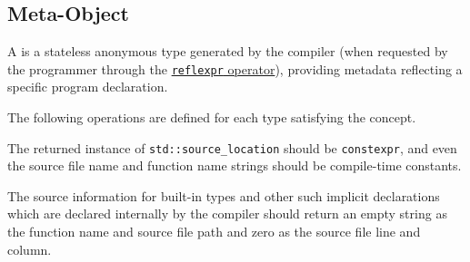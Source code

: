 \subsection{Meta-Object}
\label{concept-Meta-Object}

A  is a stateless anonymous type generated by the compiler
(when requested by the programmer through the 
\hyperref[section-reflection-operator]{\texttt{reflexpr} operator}),
providing metadata reflecting a specific program declaration.





The following operations are defined for each type satisfying the 
concept.



The returned instance of \texttt{std::source\_location} should be \texttt{constexpr},
and even the source file name and function name strings should be compile-time constants.

The source information for built-in types and other
such implicit declarations which are declared internally by the compiler
should return an empty string as the function name and source file path and
zero as the source file line and column.

